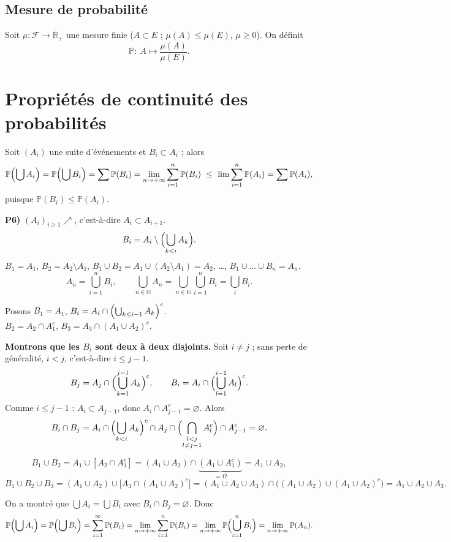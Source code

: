 \documentclass[11pt,a4paper]{article}
\newcommand{\N}{\mathbb{N}}
\newcommand{\Rb}{\overline{\mathbb{R}}}
\newcommand{\Ff}{\mathscr{F}}
\newcommand{\PP}{\mathbb{P}}
\begin{document}
\subsection*{Mesure de probabilité}

Soit $\mu:\Ff\to\Rb_+$ une mesure finie ($A\subset E$ ; $\mu(A)\le\mu(E)$, $\mu\ge0$). On définit
\[
  \PP:\ A\longmapsto\frac{\mu(A)}{\mu(E)} .
\]

\section*{Propriétés de continuité des probabilités}

Soit $(A_i)$ une suite d'événements et $B_i\subset A_i$ ; alors
\[
  \PP\Bigl(\bigcup A_i\Bigr)=\PP\Bigl(\bigcup B_i\Bigr)=\sum\PP(B_i)=\lim_{n\to+\infty}\sum_{i=1}^{n}\PP(B_i)\ \le\ \lim\sum_{i=1}^{n}\PP(A_i)=\sum\PP(A_i),
\]
puisque $\PP(B_i)\le\PP(A_i)$.

\textbf{\color{bleu}P6)} $(A_i)_{i\ge1}\nearrow$, c'est-à-dire $A_i\subset A_{i+1}$.
\[
  B_i=A_i\setminus\Bigl(\bigcup_{k<i}A_k\Bigr).
\]
$B_1=A_1$, $B_2=A_2\setminus A_1$, $B_1\cup B_2=A_1\cup(A_2\setminus A_1)=A_2$, \dots, $B_1\cup\dots\cup B_n=A_n$.
\[
  A_n=\bigcup_{i=1}^{n}B_i,\qquad \bigcup_{n\in\N}A_n=\bigcup_{n\in\N}\bigcup_{i=1}^{n}B_i=\bigcup_{i}B_i .
\]

Posons $B_1=A_1$, $B_i=A_i\cap\Bigl(\bigcup_{k\le i-1}A_k\Bigr)^c$.\\
$B_2=A_2\cap A_1^c$, \quad $B_3=A_3\cap(A_1\cup A_2)^c$.

\textbf{Montrons que les $B_i$ sont deux à deux disjoints.} Soit $i\neq j$ ; sans perte de généralité, $i<j$, c'est-à-dire $i\le j-1$.
\[
  B_j=A_j\cap\Bigl(\bigcup_{k=1}^{j-1}A_k\Bigr)^c,\qquad B_i=A_i\cap\Bigl(\bigcup_{l=1}^{i-1}A_l\Bigr)^c .
\]
Comme $i\le j-1$ : $A_i\subset A_{j-1}$, donc $A_i\cap A_{j-1}^c=\varnothing$. Alors
\[
  B_i\cap B_j=A_i\cap\Bigl(\bigcup_{k<i}A_k\Bigr)^c\cap A_j\cap\Bigl(\bigcap_{\substack{l<j\\ l\neq j-1}}A_l^c\Bigr)\cap A_{j-1}^c=\varnothing .
\]

\[
  B_1\cup B_2=A_1\cup[A_2\cap A_1^c]=(A_1\cup A_2)\cap\underbrace{(A_1\cup A_1^c)}_{=\Omega}=A_1\cup A_2 ,
\]
\[
  B_1\cup B_2\cup B_3=(A_1\cup A_2)\cup\bigl[A_3\cap(A_1\cup A_2)^c\bigr]
  =(A_1\cup A_2\cup A_3)\cap\bigl((A_1\cup A_2)\cup(A_1\cup A_2)^c\bigr)=A_1\cup A_2\cup A_3 .
\]

On a montré que $\displaystyle\bigcup A_i=\bigcup B_i$ avec $B_i\cap B_j=\varnothing$. Donc
\[
  \PP\Bigl(\bigcup A_i\Bigr)=\PP\Bigl(\bigcup B_i\Bigr)=\sum_{i=1}^{\infty}\PP(B_i)=\lim_{n\to+\infty}\sum_{i=1}^{n}\PP(B_i)
  =\lim_{n\to+\infty}\PP\Bigl(\bigcup_{i=1}^{n}B_i\Bigr)=\lim_{n\to+\infty}\PP(A_n).
\]
\end{document}
